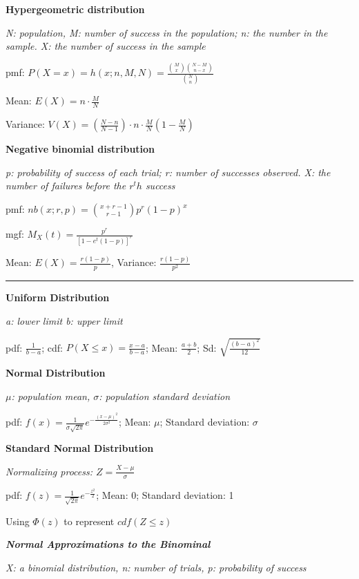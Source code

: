 \documentclass{article}
\newcommand{\sectionline}{\color{black}\rule[2pt]{0.45\textwidth}{0.05em}\color{black}}
\newcommand{\bigtitle}[1]{
	\noindent
	\textbf{#1}
}
\newcommand{\smalltitle}[1]{
	\noindent
	\textbf{\textit{#1}}
}
\begin{document}
	\bigtitle{Hypergeometric distribution}
	
	\textit{N: population, M: number of success in the population; n: the number in the sample. X: the number of success in the sample}
	
	pmf: $P(X=x) = h(x;n,M,N) = \frac{\binom{M}{x}\binom{N-M}{n-x}}{\binom{N}{n}}$
	
	Mean: $E(X) = n\cdot \frac{M}{N}$
	
	Variance: $V(X) = \left(\frac{N-n}{N-1}\right)\cdot n\cdot \frac{M}{N}\left(1-\frac{M}{N}\right)$
	
	\bigtitle{Negative binomial distribution}
	
	\textit{p: probability of success of each trial; r: number of successes observed. X: the number of failures before the $r^th$ success}
	
	pmf: $nb(x;r,p) = \binom{x+r-1}{r-1}p^r(1-p)^x$
	
	mgf: $M_X(t) = \frac{p^r}{[1-e^t(1-p)]^r}$
	
	Mean: $E(X) = \frac{r(1-p)}{p}$, 
	Variance: $\frac{r(1-p)}{p^2}$
	
	\sectionline
	
	
	
	\bigtitle{Uniform Distribution}
	
	\textit{a: lower limit b: upper limit}
	
	\noindent
	pdf: $\frac{1}{b-a}$; 
	cdf: $P(X\leq x) = \frac{x-a}{b-a}$;
	Mean: $\frac{a+b}{2}$; 
	Sd: $\sqrt{\frac{(b-a)^2}{12}}$
	
	\bigtitle{Normal Distribution}
	
	\textit{$\mu$: population mean, $\sigma$: population standard deviation}
	
	\noindent
	pdf: $f(x) = \frac{1}{\sigma \sqrt{2\pi}}e^{-\frac{(x-\mu)^2}{2\sigma^2}}$;
	Mean: $\mu$; 
	Standard deviation: $\sigma$
	
	\bigtitle{Standard Normal Distribution}
	
	\textit{Normalizing process: $Z = \frac{X-\mu}{\sigma}$}
	
	pdf: $f(z) = \frac{1}{\sqrt{2\pi}}e^{-\frac{z^2}{2}} $;
	Mean: 0; 
	Standard deviation: 1
	
	Using $\Phi (z)$ to represent $cdf(Z\leq z)$
	
	
	
	
	\smalltitle{Normal Approximations to the Binominal}
	
	
	\textit{X: a binomial distribution, n: number of trials, p: probability of success}
	
\end{document}
